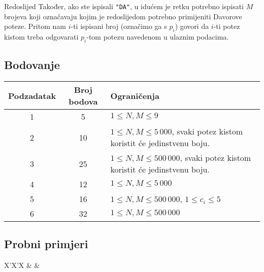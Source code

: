 \begin{statement}[
  problempoints=100,
  timelimit=4 sekunde,
  memorylimit=512 MiB,
]{Redoslijed}
Također, ako ste ispisali \texttt{"DA"}, u idućem je retku potrebno ispisati
$M$ brojeva koji označavaju kojim je redoslijedom potrebno primijeniti Davorove
poteze. Pritom nam $i$-ti ispisani broj (označimo ga s $p_i$) govori da $i$-ti
potez kistom treba odgovarati $p_i$-tom potezu navedenom u ulaznim podacima.

\subsection*{Bodovanje}
{\renewcommand{\arraystretch}{1.4}
  \setlength{\tabcolsep}{6pt}
  \begin{tabular}{ccl}
 Podzadatak & Broj bodova & Ograničenja \\ \midrule
  1 & 5 & $1 \le N, M \le 9$ \\
  2 & 10 & $1 \le N, M \le 5\,000$, svaki potez kistom koristit će jedinstvenu boju. \\
  3 & 25 & $1 \le N, M \le 500\,000$, svaki potez kistom koristit će jedinstvenu boju. \\
  4 & 12 & $1 \le N, M \le 5\,000$ \\
  5 & 16 & $1 \le N, M \le 500\,000$, $1 \le c_i \le 5$\\
  6 & 32 & $1 \le N, M \le 500\,000$ \\
\end{tabular}}

\subsection*{Probni primjeri}
\begin{tabularx}{\textwidth}{X'X'X}
 &
 &
\end{tabularx}


\end{statement}

